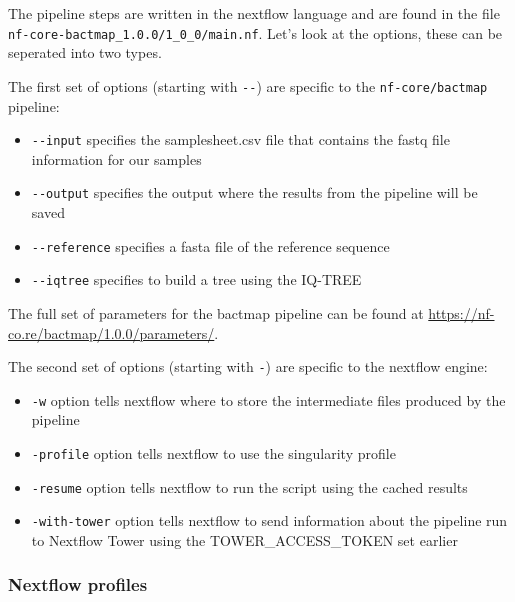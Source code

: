 \documentclass[11pt]{article}
\providecommand{\tightlist}{%
      \setlength{\itemsep}{0pt}\setlength{\parskip}{0pt}}
\begin{document}
    The pipeline steps are written in the nextflow language and are found in
the file \texttt{nf-core-bactmap\_1.0.0/1\_0\_0/main.nf}. Let's look at
the options, these can be seperated into two types.

The first set of options (starting with \texttt{-\/-}) are specific to
the \texttt{nf-core/bactmap} pipeline:

\begin{itemize}
\tightlist
\item
  \texttt{-\/-input} specifies the samplesheet.csv file that contains
  the fastq file information for our samples\\
\item
  \texttt{-\/-output} specifies the output where the results from the
  pipeline will be saved\\
\item
  \texttt{-\/-reference} specifies a fasta file of the reference
  sequence\\
\item
  \texttt{-\/-iqtree} specifies to build a tree using the IQ-TREE
\end{itemize}

The full set of parameters for the bactmap pipeline can be found at
\url{https://nf-co.re/bactmap/1.0.0/parameters/}.

The second set of options (starting with \texttt{-}) are specific to the
nextflow engine:

\begin{itemize}
\tightlist
\item
  \texttt{-w} option tells nextflow where to store the intermediate
  files produced by the pipeline\\
\item
  \texttt{-profile} option tells nextflow to use the singularity
  profile\\
\item
  \texttt{-resume} option tells nextflow to run the script using the
  cached results\\
\item
  \texttt{-with-tower} option tells nextflow to send information about
  the pipeline run to Nextflow Tower using the TOWER\_ACCESS\_TOKEN set
  earlier
\end{itemize}

    \hypertarget{nextflow-profiles}{%
\subsubsection{Nextflow profiles}\label{nextflow-profiles}}
\end{document}
